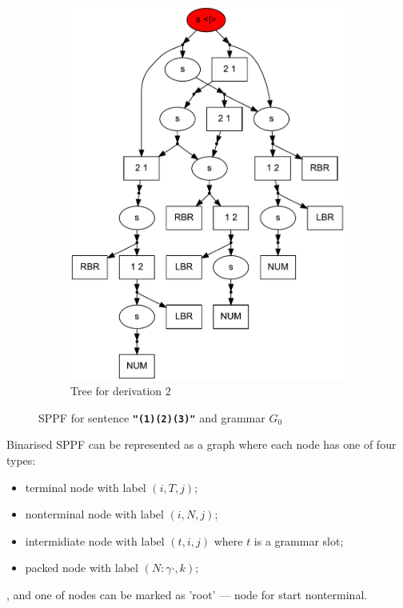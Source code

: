 \begin{figure}[ht]
\begin{center}
\begin{subfigure}[b]{0.3\textwidth}
        \includegraphics[width=\textwidth]{dot/Brackets.pdf}
        \caption{Tree for derivation 2}
        \label{tree2}        
    \end{subfigure}
    \caption{SPPF for sentence \textbf{\texttt{"(1)(2)(3)"}} and grammar $G_0$}
    \label{sppfSample}
    \end{center}                
\end{figure}

Binarised SPPF can be represented as a graph where each node has one of four types: 

\begin{itemize}
    \item terminal node with label $(i,T,j)$;
    \item nonterminal node with label $(i,N,j)$;
    \item intermidiate node with label $(t,i,j)$ where $t$ is a grammar slot;
    \item packed node with label $(N : \gamma \cdot, k)$;
\end{itemize}
, and one of nodes can be marked as 'root' --- node for start nonterminal.


